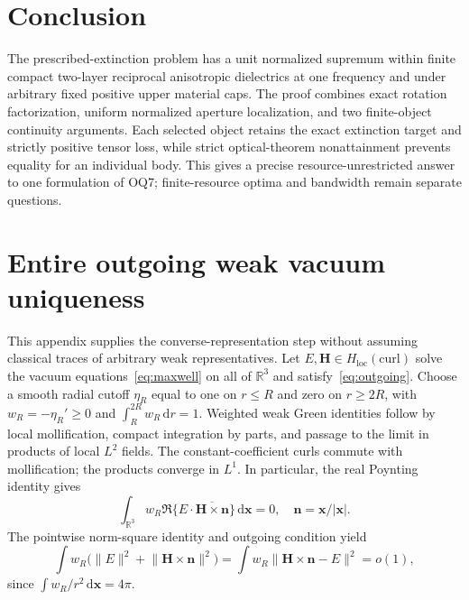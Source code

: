 \documentclass[11pt]{article}
\newcommand{\dd}{\,\mathrm{d}}
\newcommand{\norm}[1]{\lVert #1\rVert}
\newcommand{\abs}[1]{\lvert #1\rvert}
\begin{document}
\section{Conclusion}\label{sec:conclusion}
The prescribed-extinction problem has a unit normalized supremum within finite compact two-layer reciprocal anisotropic dielectrics at one frequency and under arbitrary fixed positive upper material caps. The proof combines exact rotation factorization, uniform normalized aperture localization, and two finite-object continuity arguments. Each selected object retains the exact extinction target and strictly positive tensor loss, while strict optical-theorem nonattainment prevents equality for an individual body. This gives a precise resource-unrestricted answer to one formulation of OQ7; finite-resource optima and bandwidth remain separate questions.

\appendix
\section{Entire outgoing weak vacuum uniqueness}\label{app:weak}
This appendix supplies the converse-representation step without assuming classical traces of arbitrary weak representatives. Let $E,\mathbf H\in H_{\mathrm{loc}}(\mathrm{curl})$ solve the vacuum equations~\eqref{eq:maxwell} on all of $\mathbb R^3$ and satisfy~\eqref{eq:outgoing}. Choose a smooth radial cutoff $\eta_R$ equal to one on $r\leq R$ and zero on $r\geq2R$, with $w_R=-\eta_R'\geq0$ and $\int_R^{2R}w_R\dd r=1$. Weighted weak Green identities follow by local mollification, compact integration by parts, and passage to the limit in products of local $L^2$ fields. The constant-coefficient curls commute with mollification; the products converge in $L^1$. In particular, the real Poynting identity gives
\begin{equation}\label{eq:weak-energy}
 \int_{\mathbb R^3}w_R\Re\{E\cdot\overline{\mathbf H\times\mathbf n}\}\dd\mathbf x=0,
 \quad\mathbf n=\mathbf x/\abs{\mathbf x}.
\end{equation}
The pointwise norm-square identity and outgoing condition yield
\begin{equation}\label{eq:weak-shell}
 \int w_R\bigl(\norm E^2+\norm{\mathbf H\times\mathbf n}^2\bigr)
 =\int w_R\norm{\mathbf H\times\mathbf n-E}^2=o(1),
\end{equation}
since $\int w_R/r^2\dd\mathbf x=4\pi$.
\end{document}
